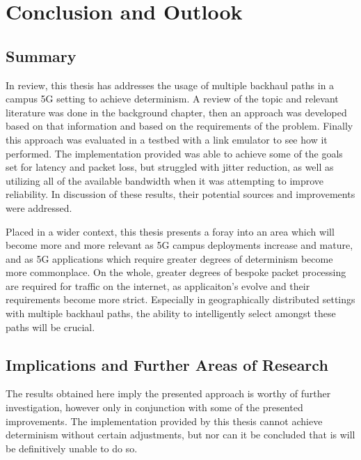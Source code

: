 
\cleardoublepage
\chapter{Conclusion and Outlook}
\label{cha:conclusion}

\section{Summary}

In review, this thesis has addresses the usage of multiple backhaul paths in a campus 5G setting to achieve determinism. A review of the topic and relevant literature was done in the background chapter, then an approach was developed based on that information and based on the requirements of the problem. Finally this approach was evaluated in a testbed with a link emulator to see how it performed. The implementation provided was able to achieve some of the goals set for latency and packet loss, but struggled with jitter reduction, as well as utilizing all of the available bandwidth when it was attempting to improve reliability. In discussion of these results, their potential sources and improvements were addressed.

Placed in a wider context, this thesis presents a foray into an area which will become more and more relevant as 5G campus deployments increase and mature, and as 5G applications which require greater degrees of determinism become more commonplace. On the whole, greater degrees of bespoke packet processing are required for traffic on the internet, as applicaiton's evolve and their requirements become more strict. Especially in geographically distributed settings with multiple backhaul paths, the ability to intelligently select amongst these paths will be crucial.


\section{Implications and Further Areas of Research}
\label{sec:implications}

The results obtained here imply the presented approach is worthy of further investigation, however only in conjunction with some of the presented improvements. The implementation provided by this thesis cannot achieve determinism without certain adjustments, but nor can it be concluded that is will be definitively unable to do so.


